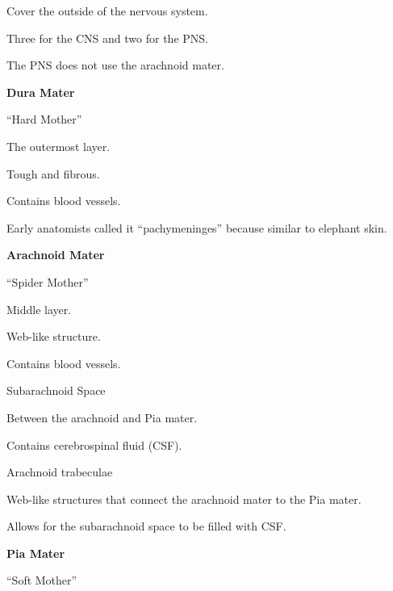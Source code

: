 \begin{coloredlist}
    \item Cover the outside of the nervous system.
    \begin{coloredlist}
        \item Three for the CNS and two for the PNS.
        \item The PNS does not use the arachnoid mater.
    \end{coloredlist}
    \item \textbf{Dura Mater}
    \begin{coloredlist}
        \item ``Hard Mother''
        \item The outermost layer.
        \item Tough and fibrous.
        \item Contains blood vessels.
        \item Early anatomists called it ``pachymeninges'' because similar to elephant skin.
    \end{coloredlist}
    \item \textbf{Arachnoid Mater}
    \begin{coloredlist}
        \item ``Spider Mother''
        \item Middle layer.
        \item Web-like structure.
        \item Contains blood vessels.
        \item Subarachnoid Space
        \begin{coloredlist}
            \item Between the arachnoid and Pia mater.
            \item Contains cerebrospinal fluid (CSF).
        \end{coloredlist}
        \item Arachnoid trabeculae
        \begin{coloredlist}
            \item Web-like structures that connect the arachnoid mater to the Pia mater.
            \item Allows for the subarachnoid space to be filled with CSF.
        \end{coloredlist}
    \end{coloredlist}
    \item \textbf{Pia Mater}
    \begin{coloredlist}
        \item ``Soft Mother''

\end{coloredlist}
\end{coloredlist}

